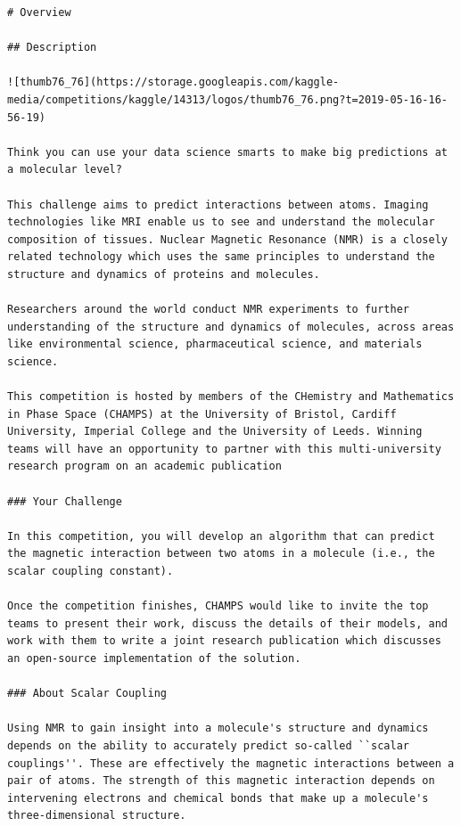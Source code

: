 \documentclass{article} %
\begin{document}
\begin{tcolorbox}[colback=lightgray!10, colframe=black, width=\textwidth, arc=2mm, boxrule=0.5mm, title=The original description for champs-scalar-coupling, breakable]
    \begin{lstlisting}[basicstyle=\tiny\ttfamily, breaklines=true]
# Overview

## Description

![thumb76_76](https://storage.googleapis.com/kaggle-media/competitions/kaggle/14313/logos/thumb76_76.png?t=2019-05-16-16-56-19)

Think you can use your data science smarts to make big predictions at a molecular level?

This challenge aims to predict interactions between atoms. Imaging technologies like MRI enable us to see and understand the molecular composition of tissues. Nuclear Magnetic Resonance (NMR) is a closely related technology which uses the same principles to understand the structure and dynamics of proteins and molecules.

Researchers around the world conduct NMR experiments to further understanding of the structure and dynamics of molecules, across areas like environmental science, pharmaceutical science, and materials science.

This competition is hosted by members of the CHemistry and Mathematics in Phase Space (CHAMPS) at the University of Bristol, Cardiff University, Imperial College and the University of Leeds. Winning teams will have an opportunity to partner with this multi-university research program on an academic publication

### Your Challenge

In this competition, you will develop an algorithm that can predict the magnetic interaction between two atoms in a molecule (i.e., the scalar coupling constant).

Once the competition finishes, CHAMPS would like to invite the top teams to present their work, discuss the details of their models, and work with them to write a joint research publication which discusses an open-source implementation of the solution.

### About Scalar Coupling

Using NMR to gain insight into a molecule's structure and dynamics depends on the ability to accurately predict so-called ``scalar couplings''. These are effectively the magnetic interactions between a pair of atoms. The strength of this magnetic interaction depends on intervening electrons and chemical bonds that make up a molecule's three-dimensional structure.


\end{lstlisting}
\end{tcolorbox}
\end{document}
